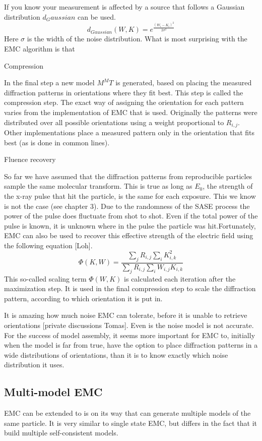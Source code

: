 If you know your measurement is affected by a source that follows a Gaussian distribution $d_Gaussian$ can be used.
\begin{equation}
d_{Gaussian}(W,K) = e^{\frac{(W_i-K_i)^2}{2\sigma^2}}
\end{equation}
Here $\sigma$ is the width of the noise distribution. What is most surprising with the EMC algorithm is that

Compression

In the final step a new model $M^MT$ is generated, based on placing the measured diffraction patterns in orientations where they fit best. This step is called the compression step. The exact way of assigning the orientation for each pattern varies from the implementation of EMC that is used. Originally the patterns were distributed over all possible orientations using a weight proportional to $R_{i,j}$. Other implementations place a measured pattern only in the orientation that fits best (as is done in common lines).

Fluence recovery

So far we have assumed that the diffraction patterns from reproducible particles sample the same molecular transform. This is true as long as $E_0$, the strength of the x-ray pulse that hit the particle, is the same for each exposure. This we know is not the case (see chapter 3). Due to the randomness of the SASE process the power of the pulse does fluctuate from shot to shot. Even if the total power of the pulse is known, it is unknown where in the pulse the particle was hit.Fortunately, EMC can also be used to recover this effective strength of the electric field using the following equation [Loh].
\begin{equation}
\Phi(K,W) = \frac{\sum_{j} R_{i,j} \sum_{i} K_{i,k}^2 }{\sum_{j} R_{i,j} \sum_{i} W_{i,j} K_{i,k}}
\end{equation}
This so-called scaling term $\Phi(W,K)$ is calculated each iteration after the maximization step. It is used in the final compression step to scale the diffraction pattern, according to which orientation it is put in.




It is amazing how much noise EMC can tolerate, before it is unable to retrieve orientations [private discussions Tomas]. Even is the noise model is not accurate. For the success of model assembly, it seems more important for EMC to, initially when the model is far from true, have the option to place diffraction patterns in a wide distributions of orientations, than it is to know exactly which noise distribution it uses.


\subsection{Multi-model EMC}
EMC can be extended to is on its way that can generate multiple models of the same particle. It is very similar to single state EMC, but differs in the fact that it build multiple self-consistent models. 